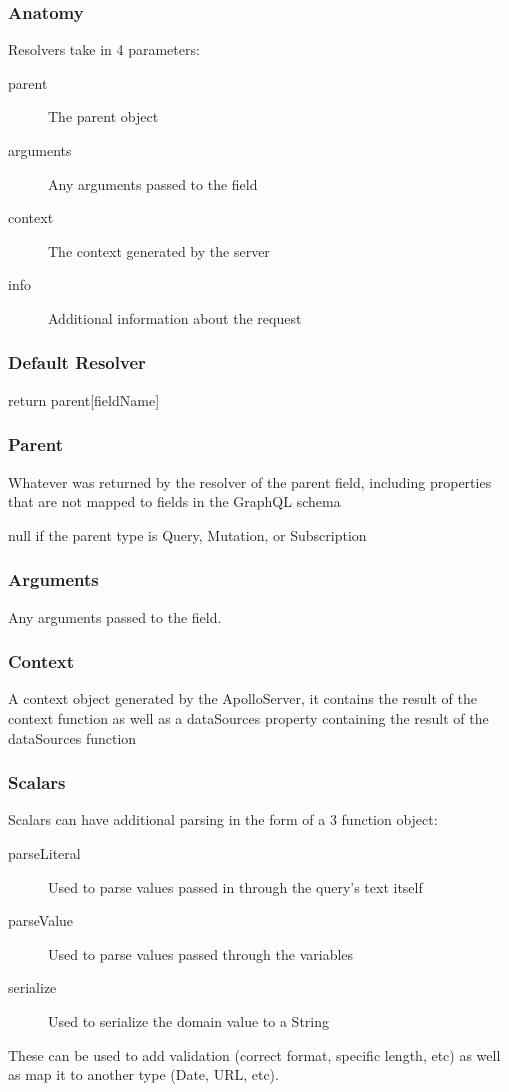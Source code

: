 \documentclass[notes]{beamer}
\begin{document}
\begin{frame}
  \frametitle{Anatomy} Resolvers take in 4 parameters:
  \begin{description}
  \item[parent] The parent object
  \item[arguments] Any arguments passed to the field
  \item[context] The context generated by the server
  \item[info] Additional information about the request
  \end{description}
\end{frame}

\begin{frame}
  \frametitle{Default Resolver} return parent[fieldName]
\end{frame}

\begin{frame}
  \frametitle{Parent} Whatever was returned by the resolver of the
  parent field, including properties that are not mapped to fields in
  the GraphQL schema

  null if the parent type is Query, Mutation, or Subscription
\end{frame}

\begin{frame}
  \frametitle{Arguments} Any arguments passed to the field.
\end{frame}

\begin{frame}
  \frametitle{Context} A context object generated by the ApolloServer,
  it contains the result of the context function as well as a
  dataSources property containing the result of the dataSources
  function
\end{frame}

\begin{frame}
  \frametitle{Scalars} Scalars can have additional parsing in the form
  of a 3 function object:
  \begin{description}
  \item[parseLiteral] Used to parse values passed in through the
    query's text itself
  \item[parseValue] Used to parse values passed through the variables
  \item[serialize] Used to serialize the domain value to a String
  \end{description}

  These can be used to add validation (correct format, specific
  length, etc) as well as map it to another type (Date, URL, etc).
\end{frame}
\end{document}
